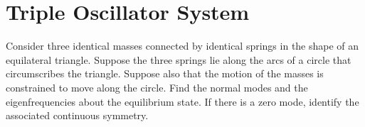 \documentclass[11pt]{article}
\newenvironment{statement}
{
    \color{darkgray}
    \ignorespaces
}
{
}
\begin{document}
\newcommand{\me}{m_3}
\newcommand{\ome}{\omega_3}
\newcommand{\te}{\theta_3}
\newcommand{\thde}{\dot{\theta}_3}
\newcommand{\thdde}{\ddot{\theta}_3}

\newcommand{\lmq}{\lambda_1}
\newcommand{\lmw}{\lambda_2}
\newcommand{\lme}{\lambda_3}

\newcommand{\ve}{v_3}

\section{Triple Oscillator System} \label{prob4}
\begin{statement}
	Consider three identical masses connected by identical springs in the shape of an equilateral triangle.  Suppose the three springs lie along the arcs of a circle that circumscribes the triangle.  Suppose also that the motion of the masses is constrained to move along the circle.  Find the normal modes and the eigenfrequencies about the equilibrium state.  If there is a zero mode, identify the associated continuous symmetry.
\end{statement}
\end{document}

